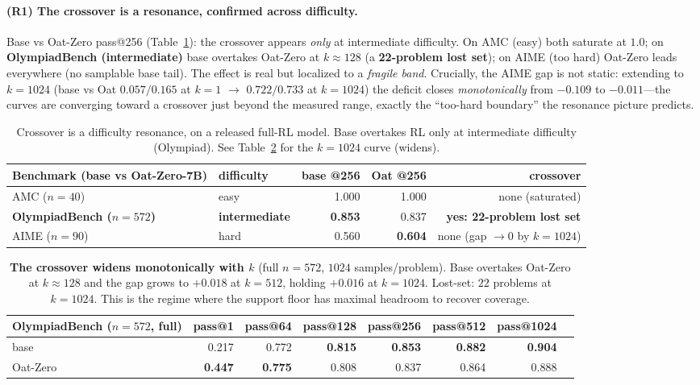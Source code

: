 \documentclass[11pt]{article}
\theoremstyle{definition}
\begin{document}
\paragraph{(R1) The crossover is a resonance, confirmed across difficulty.}
Base vs Oat-Zero pass@256 (Table~\ref{tab:oatcross}): the crossover appears \emph{only} at
intermediate difficulty. On AMC (easy) both saturate at $1.0$; on \textbf{OlympiadBench
(intermediate)} base overtakes Oat-Zero at $k{\approx}128$ (a \textbf{22-problem lost set}); on AIME (too
hard) Oat-Zero leads everywhere (no samplable base tail). The effect is real but localized to a
\emph{fragile band}. Crucially, the AIME gap is not static: extending to $k{=}1024$
(base vs Oat $0.057/0.165$ at $k{=}1$ $\to$ $0.722/0.733$ at $k{=}1024$) the deficit closes
\emph{monotonically} from $-0.109$ to $-0.011$---the curves are converging toward a crossover just
beyond the measured range, exactly the ``too-hard boundary'' the resonance picture predicts.

\begin{table}[h]\centering\small
\begin{tabular}{llrrr}
\toprule
Benchmark (base vs Oat-Zero-7B) & difficulty & base @256 & Oat @256 & crossover \\
\midrule
AMC ($n{=}40$)          & easy         & 1.000 & 1.000 & none (saturated)\\
\textbf{OlympiadBench ($n{=}572$)} & \textbf{intermediate} & \textbf{0.853} & 0.837 & \textbf{yes: 22-problem lost set}\\
AIME ($n{=}90$)         & hard         & 0.560 & \textbf{0.604} & none (gap $\to0$ by $k{=}1024$)\\
\bottomrule
\end{tabular}
\caption{Crossover is a difficulty resonance, on a released full-RL model. Base overtakes RL only at
intermediate difficulty (Olympiad). See Table~\ref{tab:oly1024} for the $k{=}1024$ curve (widens).}
\label{tab:oatcross}
\end{table}

\begin{table}[h]\centering\small
\begin{tabular}{lrrrrrrr}
\toprule
OlympiadBench ($n{=}572$, full) & pass@1 & pass@64 & pass@128 & pass@256 & pass@512 & pass@1024\\
\midrule
base      & 0.217 & 0.772 & \textbf{0.815} & \textbf{0.853} & \textbf{0.882} & \textbf{0.904}\\
Oat-Zero  & \textbf{0.447} & \textbf{0.775} & 0.808 & 0.837 & 0.864 & 0.888\\
\bottomrule
\end{tabular}
\caption{\textbf{The crossover widens monotonically with $k$} (full $n{=}572$, $1024$ samples/problem).
Base overtakes Oat-Zero at $k{\approx}128$ and the gap grows to $+0.018$ at $k{=}512$, holding
$+0.016$ at $k{=}1024$. Lost-set: $22$ problems at $k{=}1024$. This is the regime where the support
floor has maximal headroom to recover coverage.}
\label{tab:oly1024}
\end{table}
\end{document}

